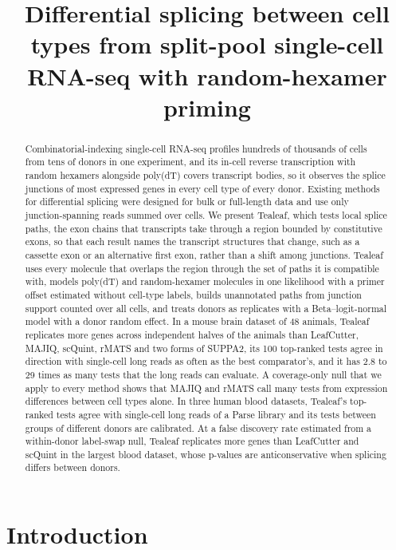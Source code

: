 \documentclass[11pt]{article}
\title{Differential splicing between cell types from split-pool single-cell RNA-seq with random-hexamer priming}
\author{}
\date{}
\begin{document}
\maketitle

\begin{abstract}
Combinatorial-indexing single-cell RNA-seq profiles hundreds of thousands of cells from tens of donors in one experiment, and its in-cell reverse transcription with random hexamers alongside poly(dT) covers transcript bodies, so it observes the splice junctions of most expressed genes in every cell type of every donor. Existing methods for differential splicing were designed for bulk or full-length data and use only junction-spanning reads summed over cells. We present Tealeaf, which tests local splice paths, the exon chains that transcripts take through a region bounded by constitutive exons, so that each result names the transcript structures that change, such as a cassette exon or an alternative first exon, rather than a shift among junctions. Tealeaf uses every molecule that overlaps the region through the set of paths it is compatible with, models poly(dT) and random-hexamer molecules in one likelihood with a primer offset estimated without cell-type labels, builds unannotated paths from junction support counted over all cells, and treats donors as replicates with a Beta--logit-normal model with a donor random effect. In a mouse brain dataset of 48 animals, Tealeaf replicates more genes across independent halves of the animals than LeafCutter, MAJIQ, scQuint, rMATS and two forms of SUPPA2, its 100 top-ranked tests agree in direction with single-cell long reads as often as the best comparator's, and it has 2.8 to 29 times as many tests that the long reads can evaluate. A coverage-only null that we apply to every method shows that MAJIQ and rMATS call many tests from expression differences between cell types alone. In three human blood datasets, Tealeaf's top-ranked tests agree with single-cell long reads of a Parse library and its tests between groups of different donors are calibrated. At a false discovery rate estimated from a within-donor label-swap null, Tealeaf replicates more genes than LeafCutter and scQuint in the largest blood dataset, whose p-values are anticonservative when splicing differs between donors.
\end{abstract}

\section{Introduction}
\end{document}
